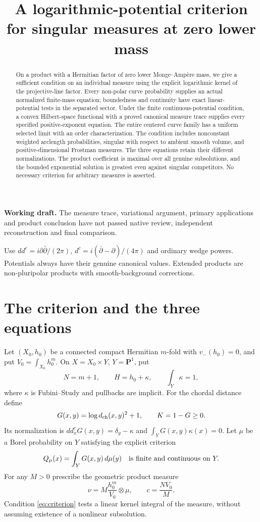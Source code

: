 \documentclass[11pt]{article}
\title{A logarithmic-potential criterion for singular measures at zero lower mass}
\author{}\date{}
\newcommand{\ddc}{dd^c}
\newcommand{\dc}{d^c}
\theoremstyle{remark}\newtheorem{remark}[theorem]{Remark}
\begin{document}
\maketitle
\noindent\textbf{Working draft.} The measure trace, variational argument,
primary applications and product conclusion have not passed native
review, independent reconstruction and final comparison.
\begin{abstract}
On a product with a Hermitian factor of zero lower Monge--Amp\`ere mass,
we give a sufficient condition on an individual measure using the
explicit logarithmic kernel of the projective-line factor. Every non-polar
curve probability supplies an actual normalized finite-mass equation;
boundedness and continuity have exact linear-potential tests in the
separated sector. Under the finite continuous-potential condition, a
convex Hilbert-space functional with a proved canonical measure trace
supplies every specified positive-exponent equation.
The entire centered curve family has a uniform selected limit with an
order characterization. The condition includes nonconstant weighted
arclength probabilities, singular with respect to ambient smooth volume,
and positive-dimensional Frostman measures. The three equations retain
their different normalizations. The product coefficient is maximal over all
genuine subsolutions, and the bounded exponential solution is greatest even
against singular competitors. No necessary criterion for arbitrary measures
is asserted.
\end{abstract}

Use $\ddc=i\partial\bar\partial/(2\pi)$,
$\dc=i(\bar\partial-\partial)/(4\pi)$ and ordinary wedge powers.
Potentials always have their genuine canonical values. Extended products
are non-pluripolar products with smooth-background corrections.

\section{The criterion and the three equations}
Let $(X_0,h_0)$ be a connected compact Hermitian $m$-fold with
$v_-(h_0)=0$, and put $V_0=\int_{X_0}h_0^m$.
On $X=X_0\times Y$, $Y=\mathbf P^1$, put
\[
 N=m+1,\qquad H=h_0+\kappa,\qquad \int_Y\kappa=1,
\]
where $\kappa$ is Fubini--Study and pullbacks are implicit.
For the chordal distance define
\[
 G(x,y)=\log d_{\rm ch}(x,y)^2+1,\qquad K=1-G\geq0.
\]
Its normalization is
$\ddc_xG(x,y)=\delta_y-\kappa$ and $\int_YG(x,y)\kappa(x)=0$.
Let $\mu$ be a Borel probability on $Y$ satisfying the explicit criterion
\begin{equation}\label{eq:criterion}
 Q_\mu(x)=\int_YG(x,y)\,d\mu(y)\quad\hbox{is finite and continuous on }Y.
\end{equation}
For any $M>0$ prescribe the geometric product measure
\[
 \nu=M\frac{h_0^m}{V_0}\otimes\mu,\qquad c=\frac{NV_0}{M}.
\]
Condition \eqref{eq:criterion} tests a linear kernel integral of the
measure, without assuming existence of a nonlinear subsolution.
\end{document}
